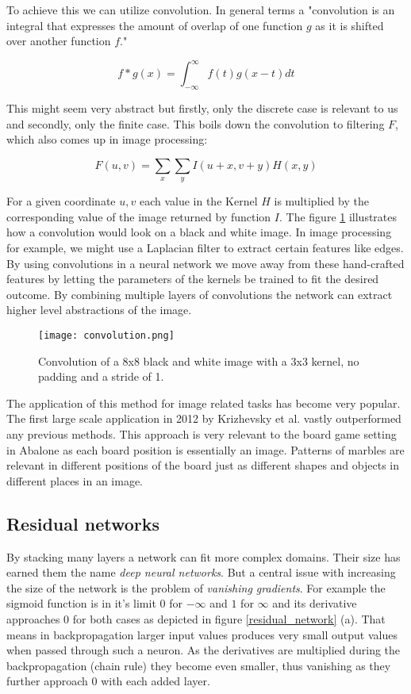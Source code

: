 To achieve this we can utilize convolution. In general terms a "convolution is an integral that expresses the amount of overlap of one function $g$ as it is shifted over another function $f$." \cite{weisstein_convolution_nodate}

$$
    f * g(x) = \int_{-\infty}^{\infty} f(t)g(x - t) dt
$$

This might seem very abstract but firstly, only the discrete case is relevant to us and secondly, only the finite case. This boils down the convolution to filtering $F$, which also comes up in image processing:

$$
    F(u, v) = \sum_{x} \sum_{y} I(u+x, v+y)H(x, y)
$$

For a given coordinate $u,v$ each value in the Kernel $H$ is multiplied by the  corresponding value of the image returned by function $I$. The figure \ref{convolution} illustrates how a convolution would look on a black and white image. In image processing for example, we might use a Laplacian filter to extract certain features like edges. By using convolutions in a neural network we move away from these hand-crafted features by letting the parameters of the kernels be trained to fit the desired outcome. By combining multiple layers of convolutions the network can extract higher level abstractions of the image. \cite{ilin_abstraction_2017}

\begin{figure}
    \centering
    \texttt{[image: convolution.png]}
    \caption{Convolution of a 8x8 black and white image with a 3x3 kernel, no padding and a stride of 1. \cite{bruasdal_deep_2020}}
    \label{convolution}
\end{figure}


The application of this method for image related tasks has become very popular. The first large scale application in 2012 by Krizhevsky et al. \cite{krizhevsky_imagenet_2017} vastly outperformed any previous methods. This approach is very relevant to the board game setting in Abalone as each board position is essentially an image. Patterns of marbles are relevant in different positions of the board just as different shapes and objects in different places in an image.

\subsection{Residual networks}
By stacking many layers a network can fit more complex domains. Their size has earned them the name \textit{deep neural networks}. But a central issue with increasing the size of the network is the problem of \textit{vanishing gradients}. For example the sigmoid function is in it's limit $0$ for $-\infty$ and $1$ for $\infty$ and its derivative approaches $0$ for both cases as depicted in figure \ref{residual_network} (a). That means in backpropagation larger input values produces very small output values when passed through such a neuron. As the derivatives are multiplied during the backpropagation (chain rule) they become even smaller, thus vanishing as they further approach $0$ with each added layer.

